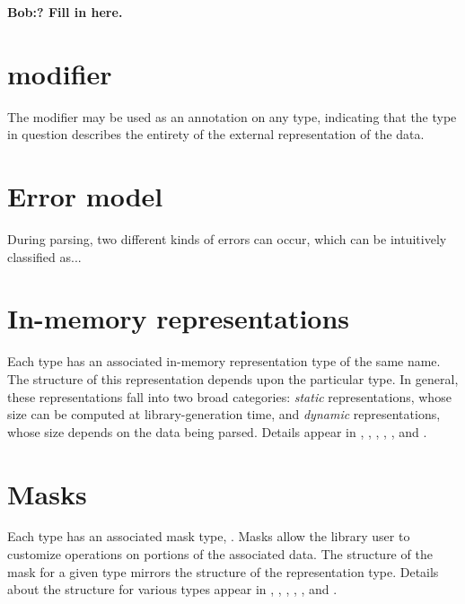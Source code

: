 \textbf{Bob:? Fill in here.} 


\section{\Pfile{} modifier}
The \Pfile{} modifier may be used as an annotation on any \pads{}
type, indicating that the type in question describes the entirety of
the external representation of the data.

\section{Error model}
\label{sec:common-error-model}
During parsing, two different kinds of errors can occur, which can be
intuitively classified as...



\section{In-memory representations}
\label{sec:common-rep}
Each \PADS{} type  has an associated in-memory representation
type of the same name.  The structure of this representation depends
upon the particular \PADS{} type.  
In general, these representations fall into two broad categories:
\textit{static} representations, whose size can be computed at
library-generation time, and \textit{dynamic} representations, whose size 
depends on the data being parsed. 
Details appear in 
, ,
, , 
, and .

\section{Masks}
\label{sec:common-masks}
Each \PADS{} type  has an associated mask type, .
Masks allow the library user to customize operations on portions of
the associated data.  The structure of the mask for a given \PADS{}
type mirrors the structure of the representation type.  Details about
the structure for various types
appear in , ,
, , 
, and .


